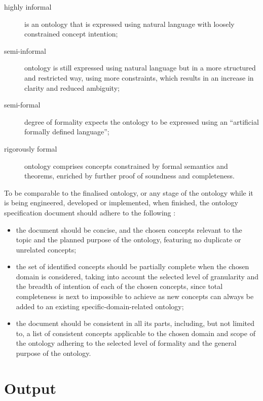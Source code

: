 \begin{description}
    \item [highly informal] is an ontology that is expressed using natural language with loosely constrained concept intention;
    \item [semi-informal] ontology is still expressed using natural language but in a more structured and restricted way, using more constraints, which results in an increase in clarity and reduced ambiguity;
    \item [semi-formal] degree of formality expects the ontology to be expressed using an \enquote[\cite{uschold1996OntologiesPrinciplesMethods}]{artificial formally defined language};
    \item [rigorously formal] ontology comprises concepts constrained by formal semantics and theorems, enriched by further proof of soundness and completeness.
\end{description}

To be comparable to the finalised ontology, or any stage of the ontology while it is being engineered, developed or implemented, when finished, the ontology specification document should adhere to the following
\cite{fernandez-lopez1997METHONTOLOGYOntologicalArt}%
:

\begin{itemize}
    \item the document should be concise, and the chosen concepts relevant to the topic and the planned purpose of the ontology, featuring no duplicate or unrelated concepts;

    \item the set of identified concepts should be partially complete when the chosen domain is considered, taking into account the selected level of granularity and the breadth of intention of each of the chosen concepts, since total completeness is next to impossible to achieve as new concepts can always be added to an existing specific-domain-related ontology;

    \item the document should be consistent in all its parts, including, but not limited to, a list of consistent concepts applicable to the chosen domain and scope of the ontology adhering to the selected level of formality and the general purpose of the ontology.
\end{itemize}



\section{Output}

